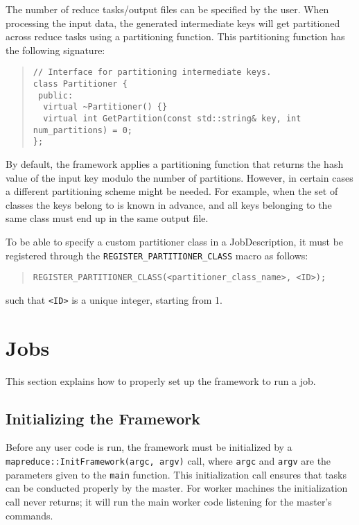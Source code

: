\documentclass{article}
\begin{document}
The number of reduce tasks/output files can be specified by the user. When processing the input data, the generated intermediate keys will get partitioned across reduce tasks using a partitioning function. This partitioning function has the following signature:

\begin{quote}
\begin{verbatim}
// Interface for partitioning intermediate keys.
class Partitioner {
 public:
  virtual ~Partitioner() {}
  virtual int GetPartition(const std::string& key, int num_partitions) = 0;
};
\end{verbatim}
\end{quote}

By default, the framework applies a partitioning function that returns the hash value of the input key modulo the number of partitions.
However, in certain cases a different partitioning scheme might be needed. For example, when the set of classes the keys belong to is known in advance, and all keys belonging to the same class must end up in the same output file.

To be able to specify a custom partitioner class in a JobDescription, it must be registered through the \texttt{REGISTER\_PARTITIONER\_CLASS} macro as follows:

\begin{quote}
\begin{verbatim}
REGISTER_PARTITIONER_CLASS(<partitioner_class_name>, <ID>);
\end{verbatim}
\end{quote}

such that \texttt{<ID>} is a unique integer, starting from 1.


\section{Jobs}

This section explains how to properly set up the framework to run a job.

\subsection{Initializing the Framework}

Before any user code is run, the framework must be initialized by a \texttt{ mapreduce::InitFramework(argc, argv)} call, where \texttt{argc} and \texttt{argv} are the parameters given to the \texttt{main} function. This initialization call ensures that tasks can be conducted properly by the master. For worker machines the initialization call never returns; it will run the main worker code listening for the master's commands.
\end{document}
